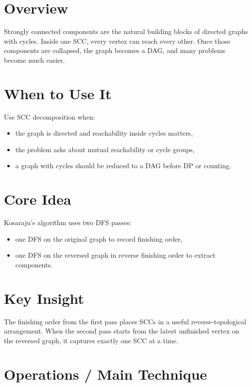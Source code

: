 \section*{Overview}

Strongly connected components are the natural building blocks of directed graphs with cycles. Inside one SCC, every
vertex can reach every other. Once those components are collapsed, the graph becomes a DAG, and many problems become
much easier.

\section*{When to Use It}

Use SCC decomposition when:

\begin{itemize}
  \item the graph is directed and reachability inside cycles matters,
  \item the problem asks about mutual reachability or cycle groups,
  \item a graph with cycles should be reduced to a DAG before DP or counting.
\end{itemize}

\section*{Core Idea}

Kosaraju's algorithm uses two DFS passes:

\begin{itemize}
  \item one DFS on the original graph to record finishing order,
  \item one DFS on the reversed graph in reverse finishing order to extract components.
\end{itemize}

\section*{Key Insight}

The finishing order from the first pass places SCCs in a useful reverse-topological arrangement. When the second pass
starts from the latest unfinished vertex on the reversed graph, it captures exactly one SCC at a time.

\section*{Operations / Main Technique}

